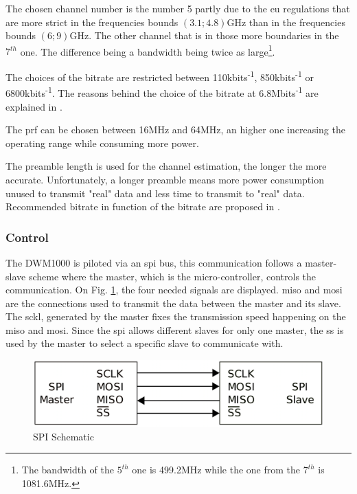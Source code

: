 The chosen channel number is the number 5 partly due to the \gls{eu} regulations that are more strict in the frequencies bounds $(3.1; 4.8)$GHz than in the frequencies bounds $(6; 9)$GHz\cite{eulaw}. The other channel that is in those more  boundaries in the $7^{th}$ one. The difference being a bandwidth being twice as large\footnote{The bandwidth of the $5^{th}$ one is 499.2MHz while the one from the $7^{th}$ is 1081.6MHz.}. 
\vspace{2mm}

The choices of the bitrate are restricted between 110kbits\textsuperscript{-1}, 850kbits\textsuperscript{-1} or 6800kbits\textsuperscript{-1}. The reasons behind the choice of the bitrate at 6.8Mbits\textsuperscript{-1} are explained in \cite{hannotier2019indoor}.
\vspace{2mm}

The \gls{prf} can be chosen between 16MHz and 64MHz, an higher one increasing the operating range while consuming more power.
\vspace{2mm}

The preamble length is used for the channel estimation, the longer the more accurate. Unfortunately, a longer preamble means more power consumption unused to transmit "real" data and less time to transmit to "real" data. Recommended bitrate in function of the bitrate are proposed in \cite{usermanual}.
\vspace{2mm}

\subsubsection{Control}

The DWM1000 is piloted via an \gls{spi} bus, this communication follows a master-slave scheme where the master, which is the micro-controller, controls the communication\cite{busspi}. On Fig. \ref{fig:spi_scheme}, the four needed signals are displayed. \gls{miso} and \gls{mosi} are the connections used to transmit the data between the master and its slave.
The \gls{sckl}, generated by the master fixes the transmission speed happening on the \gls{miso} and \gls{mosi}.  Since the \gls{spi} allows different slaves for only one master, the \gls{ss} is used by the master to select a specific slave to communicate with. 

\begin{figure}[H]
	\centering
	\includegraphics[width=.6\linewidth]{Images/SPI_scheme.png}
	\caption{SPI Schematic}
	\label{fig:spi_scheme}
\end{figure}

